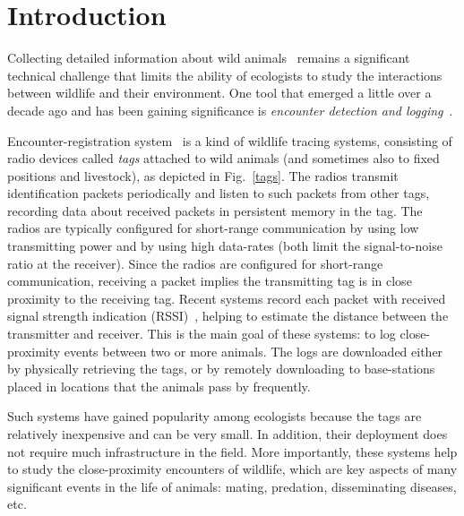 \section{Introduction}

Collecting detailed information about wild animals~\cite{Prangle2006NewRadiocolars,Rutz2012AutomatedMapping} 
remains a significant technical challenge that
limits the ability of ecologists to study the interactions between wildlife and their environment. 
One tool that emerged a little over a decade ago
and has been gaining significance is 
{\em encounter detection and logging}~\cite{Tentelier2016FishNetwork,
Bohm2009WildlifeLivestock,Ripperger2016ProximitySensing}.

Encounter-registration system~\cite{Levin2015Performance,Menhill2012NovelTelemetry,dressler2016bats} 
is a kind of wildlife tracing systems,
consisting of radio devices called {\em tags} attached to wild
animals (and sometimes also to fixed positions and livestock), as depicted in Fig.~\ref{tags}. 
The radios transmit identification
packets periodically and listen to such packets from other tags,
recording data about received packets in persistent memory in the tag. The
radios are typically configured for short-range communication by using low transmitting power and by 
using high data-rates (both limit the signal-to-noise ratio at the receiver). Since the radios
are configured for short-range communication, receiving a packet implies the transmitting tag is
in close proximity to the receiving tag. Recent systems record each packet with received signal strength
indication (RSSI)~\cite{Daiya2011Experimental}, helping to estimate the distance between the transmitter and receiver.
This is the main goal of these systems: to log close-proximity
events between two or more animals. The logs are downloaded either by physically retrieving the tags,
or by remotely downloading to base-stations placed in locations that the animals pass by frequently.

Such systems have gained popularity among ecologists because 
the tags are relatively inexpensive and can
be very small. In addition, their deployment does not require much infrastructure in the field.
More importantly, these systems help to study the close-proximity encounters of wildlife, 
which are key aspects of many significant 
events in the life of animals: mating, predation, disseminating diseases, etc.


